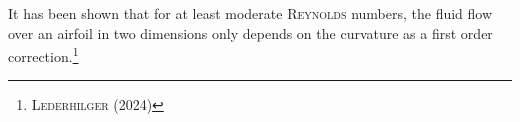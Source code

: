 It has been shown that for at least moderate \textsc{Reynolds} numbers, the fluid flow over an airfoil in two dimensions only depends on the curvature as a first order correction.\footnote{\cite{lederhilger2024boundary} \textsc{Lederhilger} (2024)}
